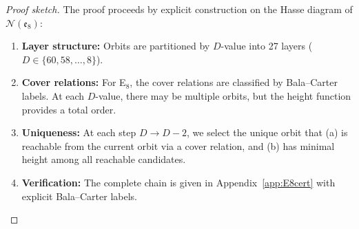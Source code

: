 \begin{proof}[Proof sketch]
The proof proceeds by explicit construction on the Hasse diagram of 
$\mathcal{N}(\mathfrak{e}_8)$:
\begin{enumerate}[leftmargin=1.5em, topsep=2pt, itemsep=1pt]
    \item \textbf{Layer structure:} Orbits are partitioned by $D$-value into 
        27 layers ($D \in \{60, 58, \ldots, 8\}$).
    \item \textbf{Cover relations:} For E$_8$, the cover relations are classified 
        by Bala--Carter labels. At each $D$-value, there may be multiple orbits, 
        but the height function provides a total order.
    \item \textbf{Uniqueness:} At each step $D \to D-2$, we select the unique 
        orbit that (a) is reachable from the current orbit via a cover relation, 
        and (b) has minimal height among all reachable candidates.
    \item \textbf{Verification:} The complete chain is given in Appendix~\ref{app:E8cert} 
        with explicit Bala--Carter labels.
\end{enumerate}
\end{proof}

